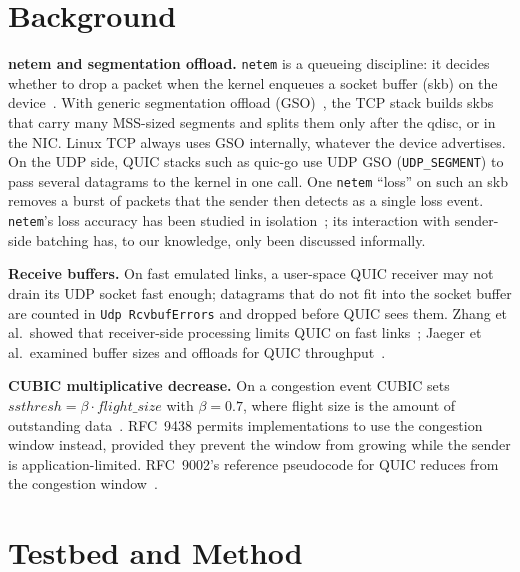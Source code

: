 \documentclass[conference]{IEEEtran}
\begin{document}
\section{Background}\label{sec:background}
\textbf{netem and segmentation offload.} \texttt{netem} is a queueing discipline: it decides whether to drop a packet when
the kernel enqueues a socket buffer (skb) on the device~\cite{linuxnetem}. With generic segmentation offload
(GSO)~\cite{linuxgso}, the TCP stack builds skbs that carry many MSS-sized segments and splits them only after the qdisc,
or in the NIC. Linux TCP always uses GSO internally, whatever the device advertises. On the UDP side, QUIC stacks such
as quic-go use UDP GSO (\texttt{UDP\_SEGMENT}) to pass several datagrams to the kernel in one call. One \texttt{netem}
``loss'' on such an skb removes a burst of packets that the sender then detects as a single loss event. \texttt{netem}'s
loss accuracy has been studied in isolation~\cite{jurgelionis2011netem}; its interaction with sender-side batching has, to our
knowledge, only been discussed informally.

\textbf{Receive buffers.} On fast emulated links, a user-space QUIC receiver may not drain its UDP socket fast enough;
datagrams that do not fit into the socket buffer are counted in \texttt{Udp RcvbufErrors} and dropped before QUIC sees
them. Zhang et al.\ showed that receiver-side processing limits QUIC on fast links~\cite{zhang2024quic}; Jaeger et
al.\ examined buffer sizes and offloads for QUIC throughput~\cite{jaeger2023highway,kempf2024fastlane}.

\textbf{CUBIC multiplicative decrease.} On a congestion event CUBIC sets
$\mathit{ssthresh} = \beta \cdot \mathit{flight\_size}$ with $\beta = 0.7$, where flight size is the amount of
outstanding data~\cite{rfc9438,rfc5681}. RFC~9438 permits implementations to use the congestion window instead, provided they
prevent the window from growing while the sender is application-limited. RFC~9002's reference pseudocode for QUIC reduces
from the congestion window~\cite{rfc9002}.

\section{Testbed and Method}\label{sec:method}
\end{document}
